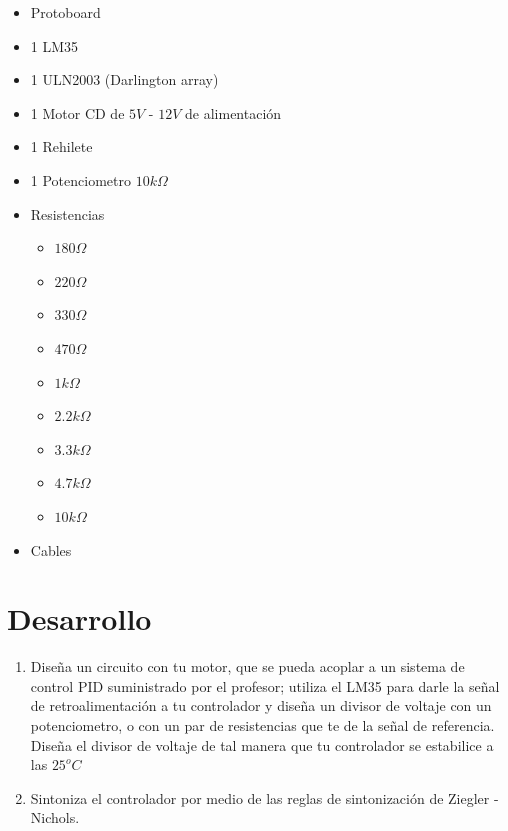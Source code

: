 	\begin{itemize}
		\item Protoboard
		\item 1 LM35
		\item 1 ULN2003 (Darlington array)
		\item 1 Motor CD de $5 V$ - $12 V$ de alimentación
		\item 1 Rehilete
		\item 1 Potenciometro $10 k\Omega$
		\item Resistencias
		\begin{itemize}
			\item $180 \Omega$
			\item $220 \Omega$
			\item $330 \Omega$
			\item $470 \Omega$
			\item $1 k\Omega$
			\item $2.2 k\Omega$
			\item $3.3 k\Omega$
			\item $4.7 k\Omega$
			\item $10 k\Omega$
		\end{itemize}
		\item Cables
	\end{itemize}


\section{Desarrollo}

	\begin{enumerate}
		\item Diseña un circuito con tu motor, que se pueda acoplar a un sistema de control PID suministrado por el profesor; utiliza el LM35 para darle la señal de retroalimentación a tu controlador y diseña un divisor de voltaje con un potenciometro, o con un par de resistencias que te de la señal de referencia. Diseña el divisor de voltaje de tal manera que tu controlador se estabilice a las $25^o C$
		\item Sintoniza el controlador por medio de las reglas de sintonización de Ziegler - Nichols.
	\end{enumerate}


